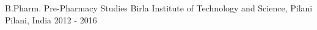 

\begin{cventries}

  \cventry
    {B.Pharm. Pre-Pharmacy Studies} %
    {Birla Institute of Technology and Science, Pilani} %
    {Pilani, India} %
    {2012 - 2016} %
    {
      \begin{cvitems} %
      \end{cvitems}
    }

\end{cventries}
